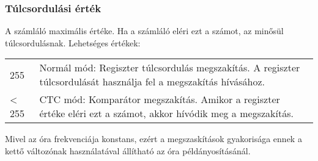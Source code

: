 \subsubsection{Túlcsordulási érték} A számláló maximális értéke. Ha a számláló eléri ezt a számot, az minősül túlcsordulásnak.
Lehetséges értékek:
\captionsetup[table]{list=no}
\begin{table}[H]
\begin{tabularx}{\textwidth}{@{}lL@{}}
    255       & Normál mód: Regiszter túlcsordulás megszakítás. A regiszter túlcsordulását használja fel a megszakítás hívásához.     \\
    < 255     & CTC mód: Komparátor megszakítás. Amikor a regiszter értéke eléri ezt a számot, akkor hívódik meg a megszakítás.          \\
    \end{tabularx}
\end{table}
\captionsetup[table]{list=yes}
Mivel az óra frekvenciája konstans, ezért a megszaskítások gyakorisága ennek a kettő változónak használatával állítható az óra példányosításánál.